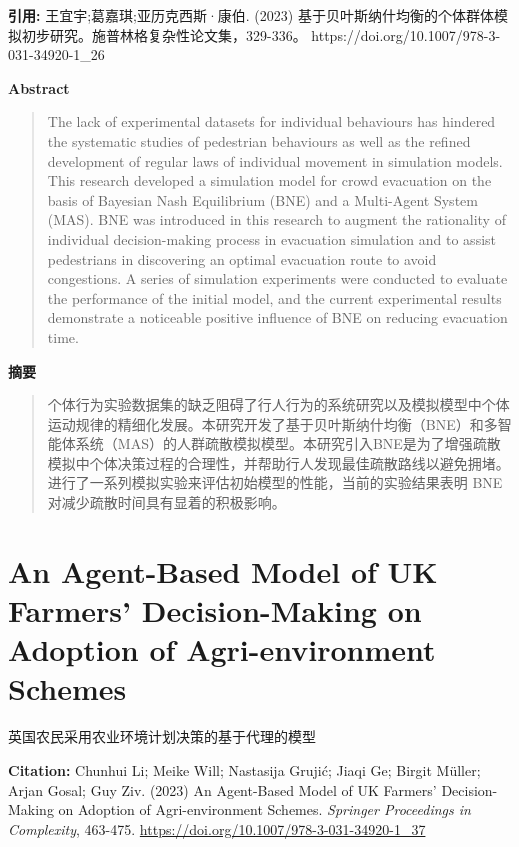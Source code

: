 \vspace{0.5em}
\noindent\textbf{引用:} 王宜宇;葛嘉琪;亚历克西斯·康伯. (2023) 基于贝叶斯纳什均衡的个体群体模拟初步研究。施普林格复杂性论文集，329-336。 https://doi.org/10.1007/978-3-031-34920-1\_26

\vspace{1.5em}
\noindent\textbf{Abstract}\par
\begin{quote}\small
The lack of experimental datasets for individual behaviours has hindered the systematic studies of pedestrian behaviours as well as the refined development of regular laws of individual movement in simulation models. This research developed a simulation model for crowd evacuation on the basis of Bayesian Nash Equilibrium (BNE) and a Multi-Agent System (MAS). BNE was introduced in this research to augment the rationality of individual decision-making process in evacuation simulation and to assist pedestrians in discovering an optimal evacuation route to avoid congestions. A series of simulation experiments were conducted to evaluate the performance of the initial model, and the current experimental results demonstrate a noticeable positive influence of BNE on reducing evacuation time.
\end{quote}

\noindent\textbf{摘要}\par
\begin{quote}\small
个体行为实验数据集的缺乏阻碍了行人行为的系统研究以及模拟模型中个体运动规律的精细化发展。本研究开发了基于贝叶斯纳什均衡（BNE）和多智能体系统（MAS）的人群疏散模拟模型。本研究引入BNE是为了增强疏散模拟中个体决策过程的合理性，并帮助行人发现最佳疏散路线以避免拥堵。进行了一系列模拟实验来评估初始模型的性能，当前的实验结果表明 BNE 对减少疏散时间具有显着的积极影响。
\end{quote}

\vspace{0.5em}
\chapter{An Agent-Based Model of UK Farmers’ Decision-Making on Adoption of Agri-environment Schemes}
\begin{center}\small 英国农民采用农业环境计划决策的基于代理的模型\end{center}

\noindent\textbf{Citation:} Chunhui Li; Meike Will; Nastasija Grujić; Jiaqi Ge; Birgit Müller; Arjan Gosal; Guy Ziv. (2023) An Agent-Based Model of UK Farmers’ Decision-Making on Adoption of Agri-environment Schemes. \textit{Springer Proceedings in Complexity}, 463-475. \url{https://doi.org/10.1007/978-3-031-34920-1_37}

